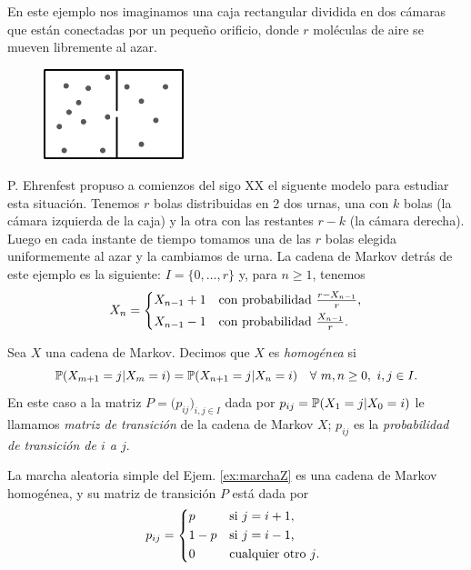 \begin{ex}\label{ex:ehrenfest}
En este ejemplo nos imaginamos una caja rectangular dividida en dos cámaras que están conectadas por un pequeño orificio, donde $r$ moléculas de aire se mueven libremente al azar.
\begin{figure}[h]
\centering
\includegraphics[width=1.6in]{figures/ehrenfest.png}
\end{figure}
P. Ehrenfest propuso a comienzos del sigo XX el siguente modelo para estudiar esta situación.
Tenemos $r$ bolas distribuidas en 2 dos urnas, una con $k$ bolas (la cámara izquierda de la caja) y la otra con las restantes $r-k$ (la cámara derecha).
Luego en cada instante de tiempo tomamos una de las $r$ bolas elegida uniformemente al azar y la cambiamos de urna.
La cadena de Markov detrás de este ejemplo es la siguiente: $I=\{0,\dots,r\}$ y, para $n\geq1$, tenemos
\[X_n=\begin{dcases*}
X_{n-1}+1 & con probabilidad $\frac{r-X_{n-1}}{r}$,\\
X_{n-1}-1 & con probabilidad $\frac{X_{n-1}}{r}$.
\end{dcases*}\]
\end{ex}


\begin{defn} 
Sea $X$ una cadena de Markov.
Decimos que $X$ es \emph{homogénea} si
\[\mathbb{P}(X_{m+1}=j|X_m=i)=\mathbb{P}(X_{n+1}=j|X_n=i)\quad\forall~m,n\geq0,~i,j\in I.\]
En este caso a la matriz $P=\big(p_{ij}\big)_{i,j\in I}$ dada por $p_{ij}=\mathbb{P}(X_{1}=j|X_0=i)$ le llamamos \emph{matriz de transición} de la cadena de Markov $X$; $p_{ij}$ es la \emph{probabilidad de transición de $i$ a $j$}.
\end{defn}

\begin{ex}
La marcha aleatoria simple del Ejem. \ref{ex:marchaZ} es una cadena de Markov homogénea, y su matriz de transición $P$ está dada por
\[p_{ij}=\begin{dcases*}
p & si $j=i+1$,\\
1-p & si $j=i-1$,\\
0 & cualquier otro $j$.
\end{dcases*}\]
\end{ex}

